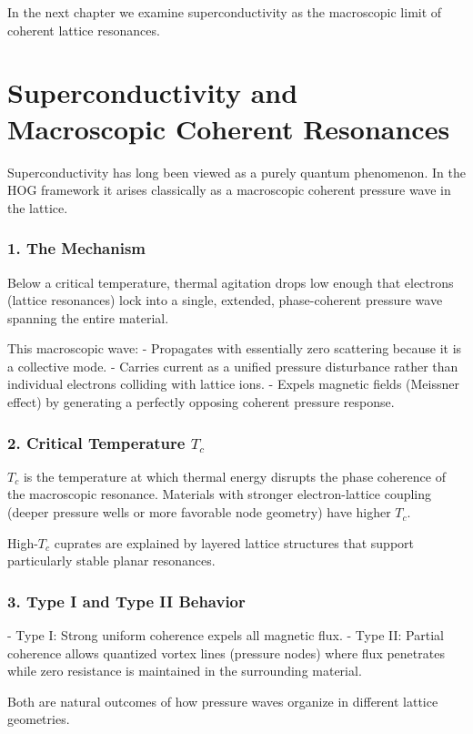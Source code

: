\documentclass[11pt,a4paper]{book}
\begin{document}
{In the next chapter we examine superconductivity as the macroscopic limit of coherent lattice resonances.

\chapter{Superconductivity and Macroscopic Coherent Resonances}

Superconductivity has long been viewed as a purely quantum phenomenon. In the HOG framework it arises classically as a macroscopic coherent pressure wave in the lattice.

\subsection{1. The Mechanism}
Below a critical temperature, thermal agitation drops low enough that electrons (lattice resonances) lock into a single, extended, phase-coherent pressure wave spanning the entire material.

This macroscopic wave:
- Propagates with essentially zero scattering because it is a collective mode.
- Carries current as a unified pressure disturbance rather than individual electrons colliding with lattice ions.
- Expels magnetic fields (Meissner effect) by generating a perfectly opposing coherent pressure response.

\subsection{2. Critical Temperature \( T_c \)}
\( T_c \) is the temperature at which thermal energy disrupts the phase coherence of the macroscopic resonance. Materials with stronger electron-lattice coupling (deeper pressure wells or more favorable node geometry) have higher \( T_c \).

High-\( T_c \) cuprates are explained by layered lattice structures that support particularly stable planar resonances.

\subsection{3. Type I and Type II Behavior}
- Type I: Strong uniform coherence expels all magnetic flux.
- Type II: Partial coherence allows quantized vortex lines (pressure nodes) where flux penetrates while zero resistance is maintained in the surrounding material.

Both are natural outcomes of how pressure waves organize in different lattice geometries.

}
\end{document}
